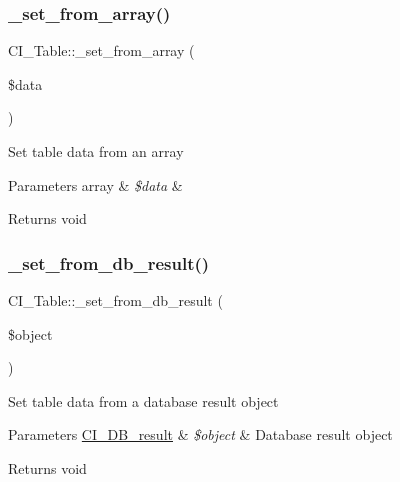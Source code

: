 \subsubsection{\texorpdfstring{\+\_\+set\+\_\+from\+\_\+array()}{\_set\_from\_array()}}
{\footnotesize\ttfamily C\+I\+\_\+\+Table\+::\+\_\+set\+\_\+from\+\_\+array (\begin{DoxyParamCaption}\item[{}]{\$data }\end{DoxyParamCaption})\hspace{0.3cm}{\ttfamily [protected]}}

Set table data from an array


\begin{DoxyParams}[1]{Parameters}
array & {\em \$data} & \\
\hline
\end{DoxyParams}
\begin{DoxyReturn}{Returns}
void 
\end{DoxyReturn}
\mbox{\label{class_c_i___table_a9892d6dcd1875dd22ad3d206ce12134e}} 
\subsubsection{\texorpdfstring{\+\_\+set\+\_\+from\+\_\+db\+\_\+result()}{\_set\_from\_db\_result()}}
{\footnotesize\ttfamily C\+I\+\_\+\+Table\+::\+\_\+set\+\_\+from\+\_\+db\+\_\+result (\begin{DoxyParamCaption}\item[{}]{\$object }\end{DoxyParamCaption})\hspace{0.3cm}{\ttfamily [protected]}}

Set table data from a database result object


\begin{DoxyParams}[1]{Parameters}
\mbox{\hyperlink{class_c_i___d_b__result}{C\+I\+\_\+\+D\+B\+\_\+result}} & {\em \$object} & Database result object \\
\hline
\end{DoxyParams}
\begin{DoxyReturn}{Returns}
void 
\end{DoxyReturn}
\mbox{\label{class_c_i___table_a955fc013a1e13834dea84b4cfdf6f2a5}} 
